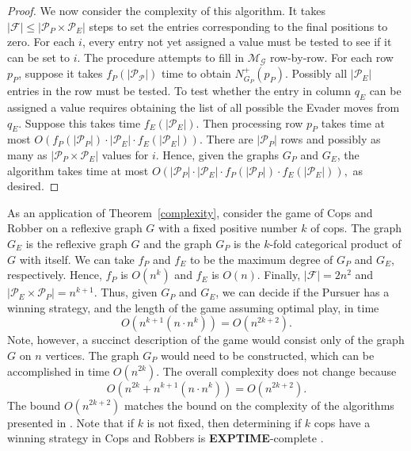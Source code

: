 \documentclass[12pt,reqno]{amsart}
\begin{document}
\begin{proof}
We now consider the complexity of this algorithm. It takes $|\mathcal{F}| \leq |\mathcal{P}_P \times \mathcal{P}_E|$ steps to set the entries corresponding to the final positions to zero.   For each
$i$, every entry not yet assigned a value must be tested to see if it can be set to $i$.  The procedure attempts to fill in $\mathcal{M}_{\mathcal{G}}$ row-by-row.  For each row $p_P$, suppose it
takes $f_P(|\mathcal{P_P}|)$ time to obtain $N^+_{G_P}(p_P)$.  Possibly all $|\mathcal{P}_E|$ entries in the row must be tested.  To test whether the entry in column $q_E$ can be assigned a value
requires obtaining the list of all possible the Evader moves from $q_E$.  Suppose this takes time $f_E(|\mathcal{P}_E|)$.  Then processing row $p_P$ takes  time at most $O(f_P(|\mathcal{P}_P|) \cdot
|\mathcal{P}_E|  \cdot f_E(|\mathcal{P}_E|)). $  There are $|\mathcal{P}_P|$ rows and possibly as many as $|\mathcal{P}_P \times \mathcal{P}_E|$ values for $i$.  Hence, given the graphs $G_P$ and
$G_E$, the algorithm takes time at most $O(|\mathcal{P}_P| \cdot  |\mathcal{P}_E|  \cdot f_P(|\mathcal{P}_P|) \cdot f_E(|\mathcal{P}_E|)),$ as desired.
\end{proof}

As an application of Theorem~\ref{complexity}, consider the game of Cops and Robber on a reflexive graph $G$ with a fixed positive number $k$ of cops.  The graph $G_E$ is the reflexive graph $G$ and
the graph $G_P$ is the $k$-fold categorical product of $G$ with itself.  We can take $f_P$ and $f_E$ to be the maximum degree of $G_P$ and $G_E$, respectively.  Hence, $f_P$ is $O(n^k)$ and $f_E$ is
$O(n)$. Finally, $|\mathcal{F}| = 2n^2$ and $|\mathcal{P}_E \times \mathcal{P}_P| = n^{k+1}$. Thus, given $G_P$ and $G_E$, we can decide if the Pursuer has a winning strategy, and the length of the
game assuming optimal play, in time
$$O(n^{k+1}(n \cdot n^k))=O(n^{2k+2}).$$
Note, however, a succinct description of the game would consist only of the graph $G$ on $n$ vertices. The graph $G_P$ would need to be constructed, which can be accomplished in time $O(n^{2k})$. The
overall complexity does not change because
 $$O(n^{2k} +n^{k+1}(n \cdot n^k))=O(n^{2k+2}).$$
The bound  $O(n^{2k+2})$
matches the bound on the complexity of the algorithms presented in \cite{bcp,HM}. Note that if $k$ is not fixed, then determining if $k$ cops
have a winning strategy in Cops and Robbers is \textbf{EXPTIME}-complete \cite{k}.
\end{document}
